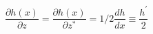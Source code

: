 \begin{equation}\label{PD}
   \frac{\partial h(x)}{\partial z} = \frac{\partial h(x)}{\partial
   z^{*}} =  1/2 \frac{dh}{dx} \equiv \frac{h^{'}}{2}
\end{equation}

